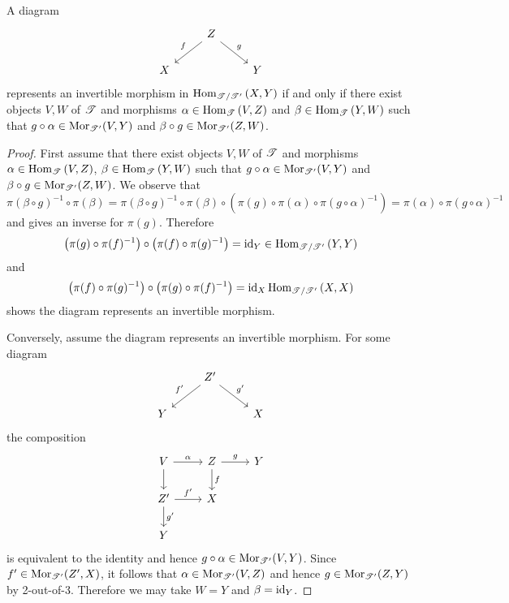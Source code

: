 \documentclass[dissertation.tex]{subfiles}
\begin{document}
\begin{lem}\label{VerdierIsos}
  A diagram
  $$\begin{tikzcd}
    & Z \arrow[swap]{ld}{f} \arrow{rd}{g}\\
    X & & Y
  \end{tikzcd}$$
  represents an invertible morphism in $\operatorname{Hom}_{\mathscr{T}/\mathscr{T}^\prime}\left(X,Y\right)$ if and only if there exist objects $V,W$ of $\mathscr{T}$ and morphisms $\alpha \in \operatorname{Hom}_{\mathscr{T}}\left(V,Z\right)$ and $\beta \in \operatorname{Hom}_{\mathscr{T}}\left(Y,W\right)$ such that $g \circ \alpha \in \operatorname{Mor}_{\mathscr{T}^\prime}(V,Y)$ and $\beta \circ g \in \operatorname{Mor}_{\mathscr{T}^\prime}(Z,W)$.
  
  \begin{proof}
    First assume that there exist objects $V,W$ of $\mathscr{T}$ and morphisms $\alpha \in \operatorname{Hom}_{\mathscr{T}}\left(V,Z\right)$, $\beta \in \operatorname{Hom}_{\mathscr{T}}\left(Y,W\right)$ such that $g \circ \alpha \in \operatorname{Mor}_{\mathscr{T}^\prime}(V,Y)$ and $\beta \circ g \in \operatorname{Mor}_{\mathscr{T}^\prime}(Z,W)$.
    We observe that
    $$\pi(\beta \circ g)^{-1} \circ \pi(\beta) = \pi(\beta \circ g)^{-1} \circ \pi(\beta) \circ \left(\pi(g) \circ \pi(\alpha) \circ \pi(g \circ \alpha)^{-1}\right) = \pi(\alpha) \circ \pi(g \circ \alpha)^{-1}$$
    and gives an inverse for $\pi(g)$.
    Therefore 
    $$\left(\pi(g) \circ \pi(f)^{-1}\right) \circ \left(\pi(f) \circ \pi(g)^{-1}\right) = \operatorname{id}_Y \in \operatorname{Hom}_{\mathscr{T}/\mathscr{T}^\prime}\left(Y,Y\right)$$ 
    and 
    $$\left(\pi(f) \circ \pi(g)^{-1}\right) \circ \left(\pi(g) \circ \pi(f)^{-1}\right) = \operatorname{id}_X\operatorname{Hom}_{\mathscr{T}/\mathscr{T}^\prime}\left(X,X\right)$$ 
    shows the diagram represents an invertible morphism.
    
    Conversely, assume the diagram represents an invertible morphism.
    For some diagram
    $$\begin{tikzcd}
      & Z^\prime \arrow[swap]{ld}{f^\prime}\arrow{rd}{g^\prime}\\
      Y & & X
    \end{tikzcd}$$
    the composition
    $$\begin{tikzcd}
      V\arrow{r}{\alpha}\arrow{d} & Z \arrow{r}{g}\arrow{d}{f} & Y\\
      Z^\prime\arrow{d}{g^\prime} \arrow{r}{f^\prime} & X\\
      Y
    \end{tikzcd}$$
    is equivalent to the identity and hence $g \circ \alpha \in \operatorname{Mor}_{\mathscr{T}^\prime}(V,Y)$.
    Since $f^\prime \in \operatorname{Mor}_{\mathscr{T}^\prime}(Z^\prime, X)$, it follows that $\alpha \in \operatorname{Mor}_{\mathscr{T}^\prime}(V,Z)$ and hence $g \in \operatorname{Mor}_{\mathscr{T}^\prime}(Z,Y)$ by 2-out-of-3.
    Therefore we may take $W = Y$ and $\beta = \operatorname{id}_Y$.
  \end{proof}
\end{lem}
\end{document}

